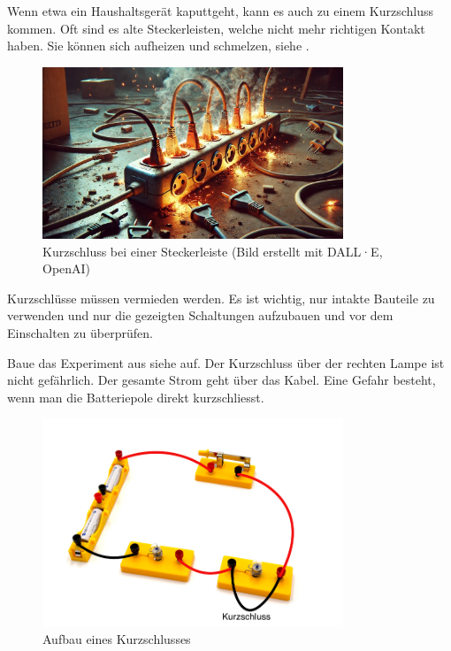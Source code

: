Wenn etwa ein Haushaltsgerät kaputtgeht, kann es auch zu einem Kurzschluss kommen.
Oft sind es alte Steckerleisten, welche nicht mehr richtigen Kontakt haben. Sie können
sich aufheizen und schmelzen, siehe .

\begin{figure}[h!]
    \centering
    \includegraphics[width=9cm]{_images/kurzschluss}
    \caption{Kurzschluss bei einer Steckerleiste (Bild erstellt mit DALL·E, OpenAI)}
    \label{fig:short_circuit}
\end{figure}

\begin{redbox}
Kurzschlüsse müssen vermieden werden. Es ist wichtig, nur intakte Bauteile zu verwenden und
nur die gezeigten Schaltungen aufzubauen und vor dem Einschalten zu überprüfen.
\end{redbox}



\newpage
{}


Baue das Experiment aus siehe  auf. Der Kurzschluss über
der rechten Lampe ist nicht gefährlich. Der gesamte Strom geht über das Kabel.
Eine Gefahr besteht, wenn man die Batteriepole direkt kurzschliesst.

\begin{figure}[h!]
    \centering
    \includegraphics[width=9cm]{_images/kurzschluss_aufbau.pdf}
    \caption{Aufbau eines Kurzschlusses}
    \label{fig:experiment_short_circuit}
\end{figure}

